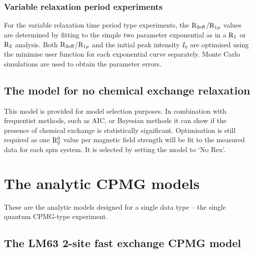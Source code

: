\subsubsection{Variable relaxation period experiments}

For the variable relaxation time period type experiments, the $\mathrm{R}_\textrm{2eff}$/$\mathrm{R}_{1\rho}$ values are determined by fitting to the simple two parameter exponential as in a $\mathrm{R}_1$ or $\mathrm{R}_2$ analysis.
Both $\mathrm{R}_\textrm{2eff}$/$\mathrm{R}_{1\rho}$ and the initial peak intensity $I_0$ are optimised using the minimise user function for each exponential curve separately.
Monte Carlo simulations are used to obtain the parameter errors.




\subsection{The model for no chemical exchange relaxation}
\label{sect: dispersion: No Rex model}

This model is provided for model selection purposes.
In combination with frequentist methods, such as AIC, or Bayesian methods it can show if the presence of chemical exchange is statistically significant.
Optimisation is still required as one $\mathrm{R}_2^0$ value per magnetic field strength will be fit to the measured data for each spin system.
It is selected by setting the model to `No Rex'.




\section{The analytic CPMG models}
\label{sect: dispersion: analytic CPMG models}

These are the analytic models designed for a single data type -- the single quantum CPMG-type experiment.



\subsection{The LM63 2-site fast exchange CPMG model}
\label{sect: dispersion: LM63 model}

